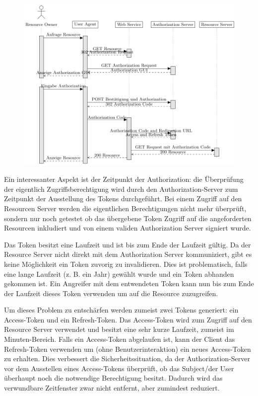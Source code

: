 \begin{figure}[h!]
	\includegraphics[width=\textwidth]{graphs/oauth2.pdf}
	\centering
\end{figure}

Ein interessanter Aspekt ist der Zeitpunkt der Authorization: die Überprüfung der eigentlich Zugriffsberechtigung wird durch den Authorization-Server zum Zeitpunkt der Ausstellung des Tokens durchgeführt. Bei einem Zugriff auf den Resourcen Server werden die eigentlichen Berechtigungen nicht mehr überprüft, sondern nur noch getestet ob das übergebene Token Zugriff auf die angeforderten Resourcen inkludiert und von einem validen Authorization Server signiert wurde.

Das Token besitzt eine Laufzeit und ist bis zum Ende der Laufzeit gültig. Da der Resource Server nicht direkt mit dem Authorization Server kommuniziert, gibt es keine Möglichkeit ein Token zuvorig zu invalidieren. Dies ist problematisch, falls eine lange Laufzeit (z. B. ein Jahr) gewählt wurde und ein Token abhanden gekommen ist. Ein Angreifer mit dem entwendeten Token kann nun bis zum Ende der Laufzeit dieses Token verwenden um auf die Resource zuzugreifen.

Um dieses Problem zu entschärfen werden zumeist zwei Tokens generiert: ein Access-Token und ein Refresh-Token. Das Access-Token wird zum Zugriff auf den Resource Server verwendet und besitzt eine sehr kurze Laufzeit, zumeist im Minuten-Bereich. Falls ein Access-Token abgelaufen ist, kann der Client das Refresh-Token verwenden um (ohne Benutzerinteraktion) ein neues Access-Token zu erhalten. Dies verbessert die Sicherheitssituation, da der Authorization-Server vor dem Ausstellen eines Access-Tokens überprüft, ob das Subject/der User überhaupt noch die notwendige Berechtigung besitzt. Dadurch wird das verwundbare Zeitfenster zwar nicht entfernt, aber zumindest reduziert.

